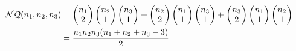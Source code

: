 \documentclass[14pt, a4paper]{article} %
\begin{document}
    \begin{equation} \label{eq1}
        \begin{split}
        \mathcal{NQ}(n_1, n_2, n_3) & = 
            \begin{pmatrix}
                    n_1 \\
                    2
                \end{pmatrix}
                \begin{pmatrix}
                    n_2 \\
                    1
                \end{pmatrix}
                \begin{pmatrix}
                    n_3 \\
                    1
                \end{pmatrix}
                +
                \begin{pmatrix}
                    n_2 \\
                    2
                \end{pmatrix}
                \begin{pmatrix}
                    n_1 \\
                    1
                \end{pmatrix}
                \begin{pmatrix}
                    n_3 \\
                    1
                \end{pmatrix}
                +
                \begin{pmatrix}
                    n_3 \\
                    2
                \end{pmatrix}
                \begin{pmatrix}
                    n_1 \\
                    1
                \end{pmatrix}
                \begin{pmatrix}
                    n_2 \\
                    1
                \end{pmatrix} \\
        & = \frac{n_1 n_2 n_3 (n_1 + n_2 + n_3 - 3)}{2} \\
        \newline
        \end{split}
    \end{equation}
\end{document}
